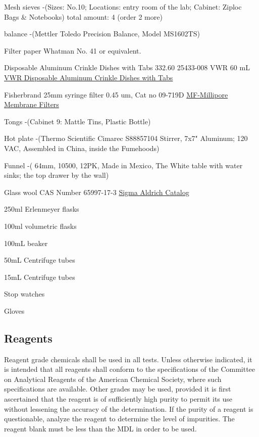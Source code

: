 \documentclass[12pt]{../SOP3_alpha}
\begin{document}
\begin{itemize*}
  \item Mesh sieves -(Sizes: No.10; Locations: entry room of the lab; Cabinet: Ziploc Bags \& Notebooks) total amount: 4 (order 2 more) 
  \item balance -(Mettler Toledo Precision Balance, Model MS1602TS)
  \item Filter paper Whatman No. 41 or equivalent. 
  \item Disposable Aluminum Crinkle Dishes with Tabs 332.60 25433-008 VWR 60 mL \href{https://us.vwr.com/store/catalog/product.jsp?product_id=4622693}{VWR Disposable Aluminum Crinkle Dishes with Tabs}
  \item Fisherbrand 25mm syringe filter 0.45 um, Cat no 09-719D \href{https://www.emdmillipore.com/US/en/product/MF-Millipore%E2%84%A2-Membrane-Filters,MM_NF-C152}{MF-Millipore Membrane Filters}

  \item Tongs -(Cabinet 9: Mattle Tins, Plastic Bottle)
  \item Hot plate -(Thermo Scientific Cimarec S88857104 Stirrer, 7x7" Aluminum; 120 VAC, Assembled in China, inside the Fumehoods)
  \item Funnel -( 64mm, 10500, 12PK, Made in Mexico, The White table with water sinks; the top drawer by the wall)
  \item Glass wool CAS Number 65997-17-3 \href{http://www.sigmaaldrich.com/catalog/product/sial/18421?lang=en&region=US}{Sigma Aldrich Catalog}
  \item 250ml Erlenmeyer flasks
  \item 100ml volumetric flasks
  \item 100mL beaker
  \item 50mL Centrifuge tubes
  \item 15mL Centrifuge tubes
  \item Stop watches 
  \item Gloves

\end{itemize*}

\subsection{Reagents}

\NP Reagent grade chemicals shall be used in all tests. Unless otherwise indicated, it is
intended that all reagents shall conform to the specifications of the Committee on Analytical Reagents of the American Chemical Society, where such specifications are available. Other grades may be used, provided it is first ascertained that the reagent is of sufficiently high purity to permit its use without lessening the accuracy of the determination. If the purity of a reagent is questionable, analyze the reagent to determine the level of impurities. The reagent blank must be less than the MDL in order to be used. 
\end{document}
